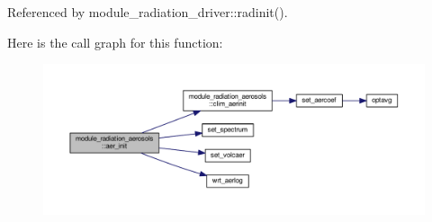 Referenced by module\+\_\+radiation\+\_\+driver\+::radinit().

Here is the call graph for this function\+:\nopagebreak
\begin{figure}[H]
\begin{center}
\leavevmode
\includegraphics[width=350pt]{group__module__radiation__aerosols_ga58ac70a5189ef62c63cf2c87465a030a_cgraph}
\end{center}
\end{figure}
\mbox{\label{group__module__radiation__aerosols_ga494892c147b1e14ffb241e413bc17a8b}} 
